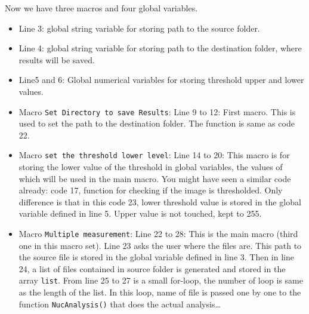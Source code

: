 \documentclass[11pt,a4paper,oneside]{report}
\newcommand{\ilcom}[1]{\texttt{\small#1}}
\begin{document}
Now we have three macros and four global variables. 
\begin{itemize}
\item Line 3: global string variable for storing path to the source folder. 
\item Line 4: global string variable for storing path to the destination folder, where results will be saved. 
\item Line5 and 6: Global numerical variables for storing threshold upper and lower values. 

\item Macro \ilcom{Set Directory to save Results}: Line 9 to 12: First macro. This is used to set the path to the destination folder. The function is same as code 22.
 
\item Macro \ilcom{set the threshold lower level}: Line 14 to 20: 
This macro is for storing the lower value of the threshold in global variables, 
the values of which will be used in the main macro. You might have seen a similar code already: code 17, 
function for checking if the image is thresholded. 
Only difference is that in this code 23, 
lower threshold value is stored in the global variable defined in line 5. 
Upper value is not touched, kept to 255. 

\item Macro \ilcom{Multiple measurement}: Line 22 to 28: This is the main macro (third one in this macro set). 
Line 23 asks the user where the files are. 
This path to the source file is stored in the global variable defined in line 3. 
Then in line 24, a list of files contained in source folder is generated and stored in the array \ilcom{list}. 
From line 25 to 27 is a small for-loop, the number of loop is same as the length of the list. 
In this loop, name of file is passed one by one to the 
function \ilcom{NucAnalysis()} that does the actual analysis\ldots


\end{itemize}
\end{document}
